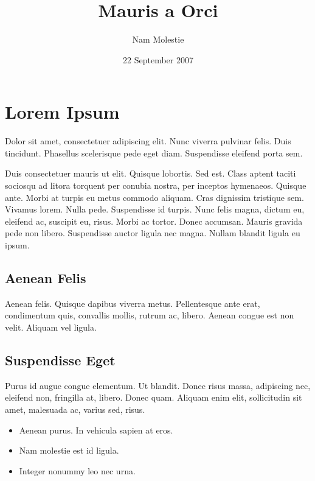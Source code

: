 \documentclass{article}
\title{Mauris a Orci}
\author{Nam Molestie}
\date{22 September 2007}
\begin{document}
\begin{titlepage}
\maketitle
\end{titlepage}

\tableofcontents
\pagebreak

\section{Lorem Ipsum}

Dolor sit amet, consectetuer adipiscing elit. Nunc viverra pulvinar
felis. Duis tincidunt. Phasellus scelerisque pede eget
diam. Suspendisse eleifend porta sem.

Duis consectetuer mauris ut elit. Quisque lobortis. Sed est. Class
aptent taciti sociosqu ad litora torquent per conubia nostra, per
inceptos hymenaeos. Quisque ante. Morbi at turpis eu metus commodo
aliquam. Cras dignissim tristique sem. Vivamus lorem. Nulla
pede. Suspendisse id turpis. Nunc felis magna, dictum eu, eleifend ac,
suscipit eu, risus. Morbi ac tortor. Donec accumsan. Mauris gravida
pede non libero. Suspendisse auctor ligula nec magna. Nullam blandit
ligula eu ipsum.

\subsection{Aenean Felis}

Aenean felis. Quisque dapibus viverra metus. Pellentesque ante erat,
condimentum quis, convallis mollis, rutrum ac, libero. Aenean congue
est non velit. Aliquam vel ligula.

\subsection{Suspendisse Eget}

Purus id augue congue elementum. Ut blandit. Donec risus massa,
adipiscing nec, eleifend non, fringilla at, libero. Donec
quam. Aliquam enim elit, sollicitudin sit amet, malesuada ac, varius
sed, risus.

\begin{itemize}
\item{} Aenean purus. In vehicula sapien at eros.
\item{} Nam molestie est id ligula.
\item{} Integer nonummy leo nec urna.
\end{itemize}
\end{document}
